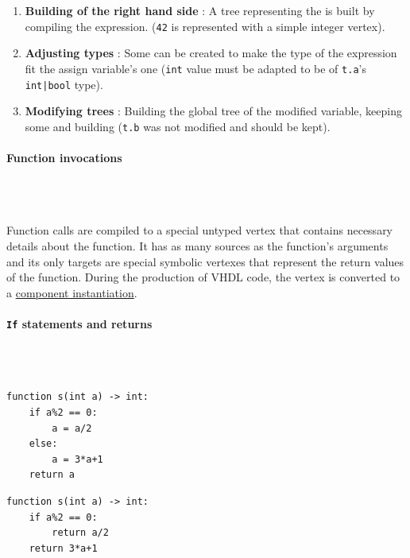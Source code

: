 \documentclass[10pt,a4paper]{article}
\newcommand{\code}{\texttt}
\renewcommand{\indent}{~\\\vspace{-.8cm}}
\newcommand{\pindent}{~\\\indent}
\newcommand{\whileyLine}{\lstinline[language=Whiley,basicstyle=\normalsize\ttfamily]}
\begin{document}
\begin{enumerate}
	\item \textbf{Building of the right hand side} : A tree representing the  is built by compiling the expression. (\whileyLine{42} is represented with a simple integer vertex). 
	\item \textbf{Adjusting types} : Some  can be created to make the type of the expression fit the assign variable's one (\whileyLine{int} value must be adapted to be of \whileyLine{t.a}'s \whileyLine{int|bool} type).
	\item \textbf{Modifying trees} : Building the global tree of the modified variable, keeping some  and building  (\whileyLine{t.b} was not modified and should be kept).
\end{enumerate}




\paragraph{Function invocations}\pindent

Function calls are compiled to a special untyped vertex that contains necessary details about the function. It has as many sources as the function's arguments and its only targets are special symbolic vertexes that represent the return values of the function. During the production of VHDL code, the vertex is converted to a \hyperref[Concurr]{component instantiation}.


\paragraph{\code{If} statements and returns}\pindent

\newbox\ifm
\begin{lrbox}{\ifm}
	\begin{minipage}[t]{.322\textwidth}
\begin{lstlisting}[language=Whiley]
function s(int a) -> int:
    if a%2 == 0:
        a = a/2
    else:
        a = 3*a+1
    return a
\end{lstlisting}
	\end{minipage}
\end{lrbox}
\newbox\ifn
\begin{lrbox}{\ifn}
\begin{minipage}[t]{.322\textwidth}
\begin{lstlisting}[language=Whiley,showlines=true]
function s(int a) -> int:
    if a%2 == 0:
        return a/2
    return 3*a+1
    
    
\end{lstlisting}
\end{minipage}
\end{lrbox}
\end{document}
